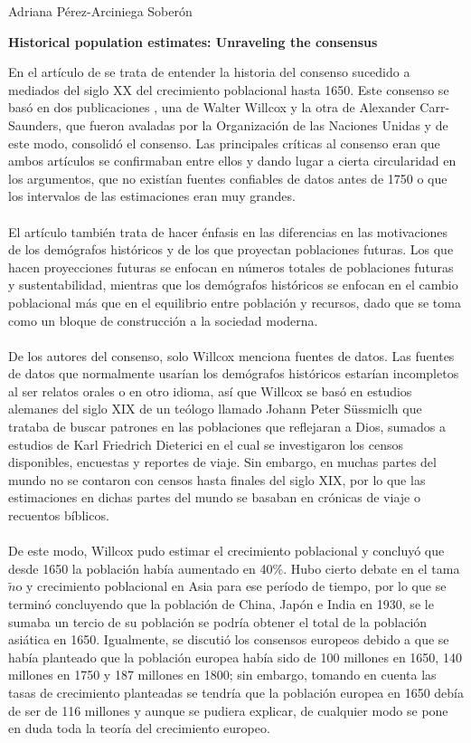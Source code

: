 \documentclass[11pt,spanish,letterpaper]{article}
\theoremstyle{plain}
\begin{document}
\begin{flushleft}
Adriana P\'erez-Arciniega Sober\'on
\end{flushleft}
\begin{center}
\textbf{Historical population estimates: Unraveling the consensus}
\end{center}
En el art\'iculo de \cite{caldwell2002historical} se trata de entender la historia del consenso sucedido a mediados del siglo XX del crecimiento poblacional hasta 1650. Este consenso se bas\'o en dos publicaciones , una de Walter Willcox y la otra de Alexander Carr-Saunders, que fueron avaladas por la Organizaci\'on de las Naciones Unidas y de este modo, consolid\'o el consenso. Las principales cr\'iticas al consenso eran que ambos art\'iculos se confirmaban entre ellos y dando lugar a cierta circularidad en los argumentos, que no exist\'ian fuentes confiables de datos antes de 1750 o que los intervalos de las estimaciones eran muy grandes.\\
\\
El art\'iculo tambi\'en trata de hacer \'enfasis en las diferencias en las motivaciones de los dem\'ografos hist\'oricos y de los que proyectan poblaciones futuras. Los que hacen proyecciones futuras se enfocan en n\'umeros totales de poblaciones futuras y sustentabilidad, mientras que los dem\'ografos hist\'oricos se enfocan en el cambio poblacional m\'as que en el equilibrio entre poblaci\'on y recursos, dado que se toma como un bloque de construcci\'on a la sociedad moderna.\\
\\
De los autores del consenso, solo Willcox menciona fuentes de datos. Las fuentes de datos que normalmente usar\'ian los dem\'ografos hist\'oricos estar\'ian incompletos al ser relatos orales o en otro idioma, as\'i que Willcox se bas\'o en estudios alemanes del siglo XIX de un te\'ologo llamado Johann Peter Süssmiclh que trataba de buscar patrones en las poblaciones que reflejaran a Dios, sumados a estudios de Karl Friedrich Dieterici en el cual se investigaron los censos disponibles, encuestas y reportes de viaje. Sin embargo, en muchas partes del mundo no se contaron con censos hasta finales del siglo XIX, por lo que las estimaciones en dichas partes del mundo se basaban en cr\'onicas de viaje o recuentos b\'iblicos.\\
\\
De este modo, Willcox pudo estimar el crecimiento poblacional y concluy\'o que desde 1650 la poblaci\'on hab\'ia aumentado en 40\%. Hubo cierto debate en el tama$\tilde{n}$o y crecimiento poblacional en Asia para ese per\'iodo de tiempo, por lo que se termin\'o concluyendo que la poblaci\'on de China, Jap\'on e India en 1930, se le sumaba un tercio de su poblaci\'on se podr\'ia obtener el total de la poblaci\'on asi\'atica en 1650. Igualmente, se discuti\'o los consensos europeos debido a que se hab\'ia planteado que la poblaci\'on europea hab\'ia sido de 100 millones en 1650, 140 millones en 1750 y 187 millones en 1800; sin embargo, tomando en cuenta las tasas de crecimiento planteadas se tendr\'ia que la poblaci\'on europea en 1650 deb\'ia de ser de 116 millones y aunque se pudiera explicar, de cualquier modo se pone en duda toda la teor\'ia del crecimiento europeo.\\
\end{document}
